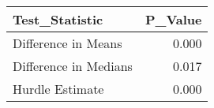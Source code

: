 \begin{table}
\centering\begingroup\fontsize{6}{8}\selectfont

\begin{tabular}{lr}
\toprule
Test\_Statistic & P\_Value\\
\midrule
Difference in Means & 0.000\\
Difference in Medians & 0.017\\
Hurdle Estimate & 0.000\\
\bottomrule
\end{tabular}
\endgroup{}
\end{table}
